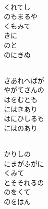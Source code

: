 \documentclass[10pt,b5j]{tarticle} %
\begin{document}
\vspace{1.5em} %
\newcommand{\linespace}{0.5em} %
\newcommand{\blocksize}{0.5\hsize} %
\newcommand{\itemmargin}{3em} %
\begin{enumerate} %
    \setlength{\itemindent}{\itemmargin} %
    \begin{minipage}[c]{\blocksize}
    
        \vspace{\linespace}
        \item~\\
        くれてし\\
        のもまるや\\
        くもみて\\
        きに\\
        のと\\
        のにきぬ
        
    \end{minipage}
    \begin{minipage}[c]{\blocksize}
        
        \vspace{\linespace}
        \item~\\
        さあれへばが\\
        やがてさんの\\
        はをむとも\\
        にはきあり\\
        はにひしるも\\
        にはのあり
        
    \end{minipage}
    \begin{minipage}[c]{\blocksize}
        
        \vspace{\linespace}
        \item~\\
        かりしの\\
        にまがふがに\\
        くみて\\
        とそそれるの\\
        のをくて\\
        のをはん
        

\end{minipage}
\end{enumerate}
\end{document}
